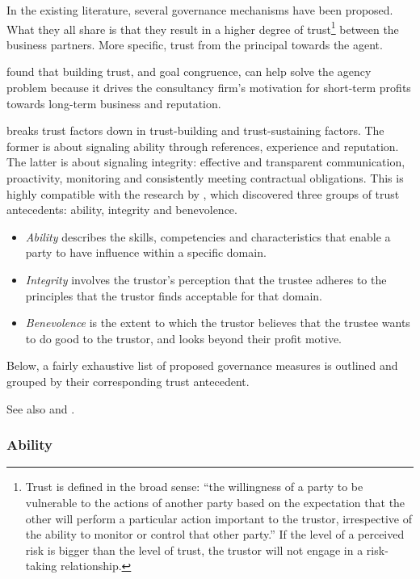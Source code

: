 \documentclass[12pt]{article}
\providecommand{\tightlist}{%
  \setlength{\itemsep}{0pt}\setlength{\parskip}{0pt}}
\begin{document}
In the existing literature, several governance mechanisms have been
proposed. What they all share is that they result in a higher degree of
trust\footnote{Trust is defined in the broad sense: ``the willingness of
  a party to be vulnerable to the actions of another party based on the
  expectation that the other will perform a particular action important
  to the trustor, irrespective of the ability to monitor or control that
  other party.'' \citep{kee1970} If the level of a perceived risk is
  bigger than the level of trust, the trustor will not engage in a
  risk-taking relationship.} between the business partners. More
specific, trust from the principal towards the agent.

\citet[265]{liberatore2010} found that building trust, and goal
congruence, can help solve the agency problem because it drives the
consultancy firm's motivation for short-term profits towards long-term
business and reputation.

\citet[193-194]{kirilov2012} breaks trust factors down in trust-building
and trust-sustaining factors. The former is about signaling ability
through references, experience and reputation. The latter is about
signaling integrity: effective and transparent communication,
proactivity, monitoring and consistently meeting contractual
obligations. This is highly compatible with the research by
\citet[717-720]{mayer1995}, which discovered three groups of trust
antecedents: ability, integrity and benevolence.

\begin{itemize}
\tightlist
\item
  \emph{Ability} describes the skills, competencies and characteristics
  that enable a party to have influence within a specific domain.
\item
  \emph{Integrity} involves the trustor's perception that the trustee
  adheres to the principles that the trustor finds acceptable for that
  domain.
\item
  \emph{Benevolence} is the extent to which the trustor believes that
  the trustee wants to do good to the trustor, and looks beyond their
  profit motive.
\end{itemize}

Below, a fairly exhaustive list of proposed governance measures is
outlined and grouped by their corresponding trust antecedent.

See also \citet{lewicki2006} and \citet{kirilov2012}.

\hypertarget{ability}{%
\subsubsection{Ability}\label{ability}}
\end{document}
